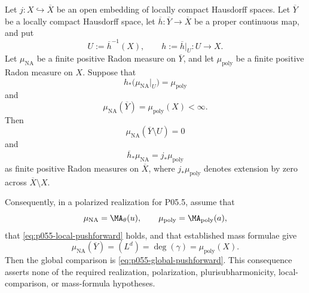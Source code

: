 
\begin{proposition}
\label{prop:p055-boundary-mass-completion}
Let \(j:X\hookrightarrow\overline X\) be an open embedding of locally compact
Hausdorff spaces.  Let \(\overline Y\) be a locally compact Hausdorff space,
let \(\overline h:\overline Y\to\overline X\) be a proper continuous map, and
put
\[
 U:=\overline h^{-1}(X),\qquad h:=\overline h|_U:U\longrightarrow X.
\]
Let \(\mu_{\mathrm{NA}}\) be a finite positive Radon measure on
\(\overline Y\), and let \(\mu_{\mathrm{poly}}\) be a finite positive Radon
measure on \(X\).  Suppose that
\begin{equation}
 h_*\bigl(\mu_{\mathrm{NA}}|_U\bigr)=\mu_{\mathrm{poly}}
 \label{eq:p055-local-pushforward}
\end{equation}
and
\begin{equation}
 \mu_{\mathrm{NA}}(\overline Y)
 =\mu_{\mathrm{poly}}(X)<\infty.
 \label{eq:p055-equal-mass}
\end{equation}
Then
\begin{equation}
 \mu_{\mathrm{NA}}(\overline Y\setminus U)=0
 \label{eq:p055-zero-source-boundary}
\end{equation}
and
\begin{equation}
 \overline h_*\mu_{\mathrm{NA}}=j_*\mu_{\mathrm{poly}}
 \label{eq:p055-global-pushforward}
\end{equation}
as finite positive Radon measures on \(\overline X\), where
\(j_*\mu_{\mathrm{poly}}\) denotes extension by zero across
\(\overline X\setminus X\).

Consequently, in a polarized realization for P05.5, assume that
\[
 \mu_{\mathrm{NA}}=\MA_\theta(u),\qquad
 \mu_{\mathrm{poly}}=\MA_{\mathrm{poly}}(a),
\]
that \eqref{eq:p055-local-pushforward} holds, and that established mass
formulae give
\[
 \mu_{\mathrm{NA}}(\overline Y)=(L^d)
 =\deg(\gamma)=\mu_{\mathrm{poly}}(X).
\]
Then the global comparison is \eqref{eq:p055-global-pushforward}.  This
consequence asserts none of the required realization, polarization,
plurisubharmonicity, local-comparison, or mass-formula hypotheses.
\end{proposition}

